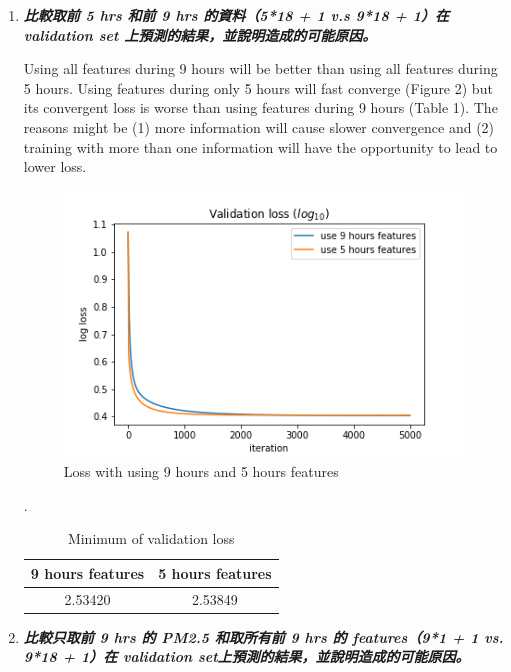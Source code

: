 \documentclass[a4paper,11pt]{article}
\begin{document}
\begin{enumerate}

	\item \textit{\textbf{比較取前 5 hrs 和前 9 hrs 的資料（5*18 + 1 v.s 9*18 + 1）在 validation set 上預測的結果，並說明造成的可能原因。}}

	Using all features during 9 hours will be better than using all features during 5 hours. Using features during only 5 hours will fast converge (Figure 2) but its convergent loss is worse than using features during 9 hours (Table 1). The reasons might be (1) more information will cause slower convergence and (2) training with more than one information will have the opportunity to lead to lower loss.\\

	\begin{figure}[htp]
	    \begin{center}
    		\includegraphics[scale=0.5]{loss_9hr_vs_5hr.png}
	    	\caption{Loss with using 9 hours and 5 hours features}
	    \end{center}
	\end{figure}
.\newline
	\begin{table}[htp]
		\begin{center}
			\begin{tabular}{ | c | c | }
			  	\hline
		  		9 hours features & 5 hours features\\[0.5ex] 
		  		\hline \hline
		  		2.53420 & 2.53849\\[0.2ex]
		  		\hline
			\end{tabular}
			\caption{Minimum of validation loss}
		\end{center}
	\end{table}

	\item \textit{\textbf{比較只取前 9 hrs 的 PM2.5 和取所有前 9 hrs 的 features（9*1 + 1 vs. 9*18 + 1）在 validation set上預測的結果，並說明造成的可能原因。}}


\end{enumerate}
\end{document}
